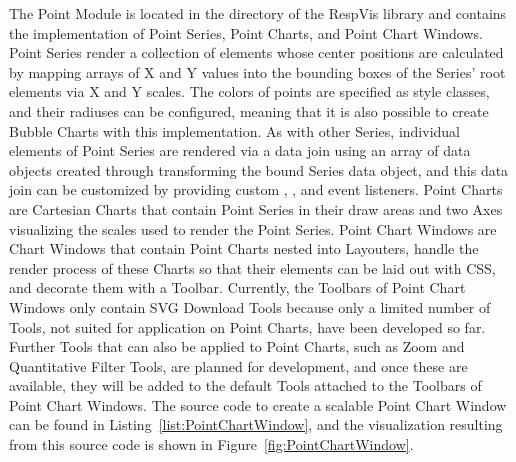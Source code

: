 The Point Module is located in the  directory of
the RespVis library and contains the implementation of Point Series,
Point Charts, and Point Chart Windows.  Point Series render a
collection of  elements whose center positions are
calculated by mapping arrays of X and Y values into the bounding boxes
of the Series' root elements via X and Y scales.  The colors of points
are specified as style classes, and their radiuses can be configured,
meaning that it is also possible to create Bubble Charts with this
implementation.  As with other Series, individual elements of Point
Series are rendered via a data join using an array of data objects
created through transforming the bound Series data object, and this
data join can be customized by providing custom ,
, and  event listeners.  Point Charts are
Cartesian Charts that contain Point Series in their draw areas and two
Axes visualizing the scales used to render the Point Series.  Point
Chart Windows are Chart Windows that contain Point Charts nested into
Layouters, handle the render process of these Charts so that their
elements can be laid out with CSS, and decorate them with a Toolbar.
Currently, the Toolbars of Point Chart Windows only contain SVG
Download Tools because only a limited number of Tools, not suited for
application on Point Charts, have been developed so far.  Further
Tools that can also be applied to Point Charts, such as Zoom and
Quantitative Filter Tools, are planned for development, and once these
are available, they will be added to the default Tools attached to the
Toolbars of Point Chart Windows.  The source code to create a scalable
Point Chart Window can be found in
Listing~\ref{list:PointChartWindow}, and the visualization resulting
from this source code is shown in Figure~\ref{fig:PointChartWindow}.
